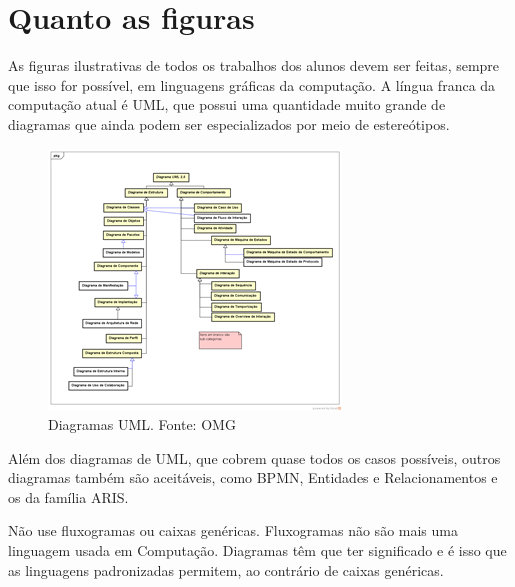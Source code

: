 \section{Quanto as figuras}

As figuras ilustrativas de todos os trabalhos dos alunos devem ser feitas, sempre que isso for possível, em linguagens gráficas da computação. A língua franca da computação atual é UML, que possui uma quantidade muito grande de diagramas que ainda podem ser especializados por meio de estereótipos.

\begin{figure}[hbt]
    \centering
    \includegraphics[width=0.7\linewidth]{Images/diagramasuml}
    \caption{Diagramas UML. Fonte: OMG}
    \label{fig:diagramasuml}
\end{figure}


Além dos diagramas de UML, que cobrem quase todos os casos possíveis, outros diagramas também são aceitáveis, como BPMN, Entidades e Relacionamentos e os da família ARIS.

Não use fluxogramas ou caixas genéricas. Fluxogramas não são mais uma linguagem usada em Computação. Diagramas têm que ter significado e é isso que as linguagens padronizadas permitem, ao contrário de caixas genéricas.
